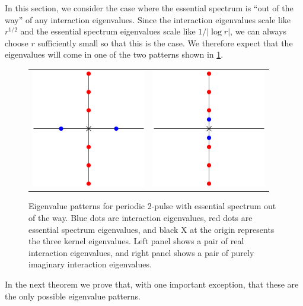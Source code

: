 \documentclass[thesis.tex]{subfiles}
\begin{document}
In this section, we consider the case where the essential spectrum is ``out of the way'' of any interaction eigenvalues. Since the interaction eigenvalues scale like $r^{1/2}$ and the essential spectrum eigenvalues scale like $1/|\log r|$, we can always choose $r$ sufficiently small so that this is the case. We therefore expect that the eigenvalues will come in one of the two patterns shown in \cref{fig:2ppatterns}.

\begin{figure}[H]
\begin{center}
\begin{tabular}{cc}
\includegraphics[width=5cm]{images/kdv5/2punstableeigpattern.eps} &
\includegraphics[width=5cm]{images/kdv5/2pstableeigpattern.eps} 
\end{tabular}
\caption{Eigenvalue patterns for periodic 2-pulse with essential spectrum out of the way. Blue dots are interaction eigenvalues, red dots are essential spectrum eigenvalues, and black X at the origin represents the three kernel eigenvalues. Left panel shows a pair of real interaction eigenvalues, and right panel shows a pair of purely imaginary interaction eigenvalues. }
\label{fig:2ppatterns}
\end{center}
\end{figure}

In the next theorem we prove that, with one important exception, that these are the only possible eigenvalue patterns. 
\end{document}
